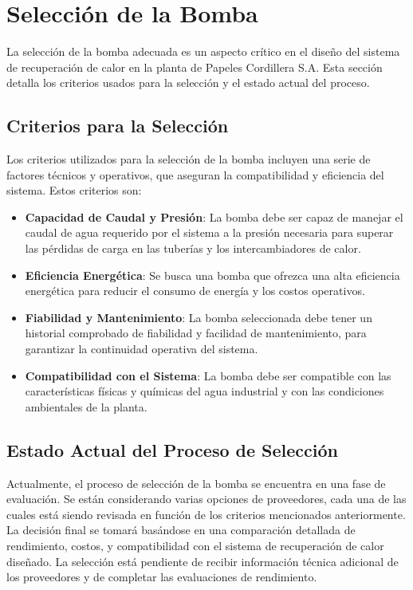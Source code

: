 \documentclass[11pt,a4paper]{article}  %
\begin{document}
\section{Selección de la Bomba}

La selección de la bomba adecuada es un aspecto crítico en el diseño del sistema de recuperación de calor en la planta de Papeles Cordillera S.A. Esta sección detalla los criterios usados para la selección y el estado actual del proceso.

\subsection{Criterios para la Selección}
Los criterios utilizados para la selección de la bomba incluyen una serie de factores técnicos y operativos, que aseguran la compatibilidad y eficiencia del sistema. Estos criterios son:

\begin{itemize}
    \item \textbf{Capacidad de Caudal y Presión}: La bomba debe ser capaz de manejar el caudal de agua requerido por el sistema a la presión necesaria para superar las pérdidas de carga en las tuberías y los intercambiadores de calor.
    
    \item \textbf{Eficiencia Energética}: Se busca una bomba que ofrezca una alta eficiencia energética para reducir el consumo de energía y los costos operativos.
    
    \item \textbf{Fiabilidad y Mantenimiento}: La bomba seleccionada debe tener un historial comprobado de fiabilidad y facilidad de mantenimiento, para garantizar la continuidad operativa del sistema.
    
    \item \textbf{Compatibilidad con el Sistema}: La bomba debe ser compatible con las características físicas y químicas del agua industrial y con las condiciones ambientales de la planta.
\end{itemize}

\subsection{Estado Actual del Proceso de Selección}
Actualmente, el proceso de selección de la bomba se encuentra en una fase de evaluación. Se están considerando varias opciones de proveedores, cada una de las cuales está siendo revisada en función de los criterios mencionados anteriormente. La decisión final se tomará basándose en una comparación detallada de rendimiento, costos, y compatibilidad con el sistema de recuperación de calor diseñado. La selección está pendiente de recibir información técnica adicional de los proveedores y de completar las evaluaciones de rendimiento.
\end{document}
